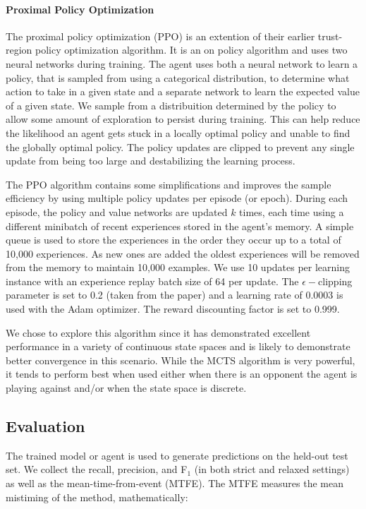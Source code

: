 \documentclass[12pt]{article}
\begin{document}
\paragraph{Proximal Policy Optimization}
The proximal policy optimization (PPO)\cite{Schulman2017ProximalPO} is an extention of their earlier trust-region policy
optimization algorithm\cite{Schulman2015TrustRP}. It is an on policy algorithm and uses two neural networks during training. 
The agent uses both a neural network to learn a policy, that is sampled
from using a categorical distribution, to determine what action to take in a given state and a separate network to learn
the expected value of a given state. We sample from a distribuition determined by the policy to allow some amount of exploration
to persist during training. This can help reduce the likelihood an agent gets stuck in a locally optimal policy and unable to 
find the globally optimal policy. The policy updates are clipped to prevent any single update from being too large and destabilizing
the learning process.

The PPO algorithm contains some simplifications and improves the sample
efficiency by using multiple policy updates per episode (or epoch). During each episode, the policy and value networks are
updated $k$ times, each time using a different minibatch of recent experiences stored in the agent's memory. A simple queue
is used to store the experiences in the order they occur up to a total of 10,000 experiences. As new ones are added the oldest
experiences will be removed from the memory to maintain 10,000 examples. We use 10 updates per learning instance with an
experience replay batch size of 64 per update. The $\epsilon-$clipping parameter is set to 0.2 (taken from the paper) and a
learning rate of 0.0003 is used with the Adam\cite{Kingma2014AdamAM} optimizer. The reward discounting factor is set to 0.999.

We chose to explore this algorithm since it has demonstrated excellent performance in a variety of continuous state spaces and
is likely to demonstrate better convergence in this scenario. While the MCTS algorithm is very powerful, it tends to perform best
when used either when there is an opponent the agent is playing against and/or when the state space is discrete.

\subsection{Evaluation}
The trained model or agent is used to generate predictions on the held-out test set. We collect the recall, precision, and 
F$_1$ (in both strict and relaxed settings) as well as the mean-time-from-event (MTFE). The MTFE measures the mean mistiming
of the method, mathematically:
\end{document}
